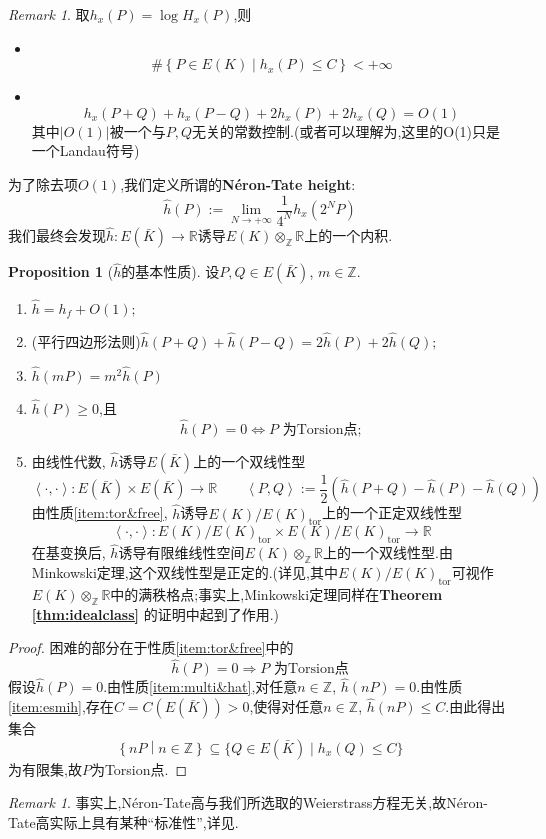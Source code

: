 \documentclass[12pt,A4paper,oneside,reqno]{amsart}
\numberwithin{equation}{section}
\theoremstyle{definition}
\newtheorem{proposition}[theorem]{Proposition}
\theoremstyle{plain}
\theoremstyle{plain}
\numberwithin{equation}{section}
\theoremstyle{remark}
\newtheorem{remark}[theorem]{Remark}
\DeclareMathOperator{\tor}{\operatorname{tor}}
\begin{document}
\begin{remark}
	取$h_x(P)=\log H_x(P)$,则
	\begin{itemize}
		\item\phantom{1}\\[-1.2cm] $$\#\left\{P \in E(K) \middle| h_x(P) \leqslant C\right\}< +\infty$$
		\item\phantom{1}\\[-1.2cm] $$h_x(P+Q)+h_x(P-Q)+2h_x(P)+2h_x(Q)=O(1)$$
		其中$|O(1)|$被一个与$P,Q$无关的常数控制.(或者可以理解为,这里的O(1)只是一个Landau符号)
	\end{itemize}
为了除去项$O(1)$,我们定义所谓的\textbf{Néron-Tate height}:
$$\hat{h}(P):=\lim_{N \rightarrow +\infty}\frac{1}{4^N}h_x(2^NP)$$
我们最终会发现$\hat{h}:E(\bar{K}) \longrightarrow \mathbb{R}$诱导$E(K) \otimes_{\mathbb{Z}}\mathbb{R}$上的一个内积.
\begin{proposition}[$\hat{h}$的基本性质]
	设$P,Q \in E(\bar{K})$, $m \in \mathbb{Z}$.
	\begin{enumerate}[1.]
		\item \label{item:esmih} $\hat{h}=h_f+O(1);$
		\item (平行四边形法则)$\hat{h}(P+Q)+\hat{h}(P-Q)=2\hat{h}(P)+2\hat{h}(Q);$
		\item\label{item:multi&hat} $\hat{h}(mP)=m^2\hat{h}(P)$
		\item\label{item:tor&free}$\hat{h}(P)\geqslant 0$,且
		$$\hat{h}(P)=0 \Longleftrightarrow P \text{ 为Torsion点};$$
		\item 由线性代数, $\hat{h}$诱导$E(\bar{K})$上的一个双线性型
		$$\left<\cdot,\cdot\right>:E(\bar{K}) \times E(\bar{K}) \longrightarrow \mathbb{R} \qquad \left<P,Q\right>:=\frac{1}{2}\left(\hat{h}(P+Q)-\hat{h}(P)-\hat{h}(Q)\right)$$
		由性质\ref{item:tor&free}, $\hat{h}$诱导$E(K)/E(K)_{\tor}$上的一个正定双线性型
		$$\left<\cdot,\cdot\right>:E(K)/E(K)_{\tor} \times E(K)/E(K)_{\tor} \longrightarrow \mathbb{R}$$
		在基变换后, $\hat{h}$诱导有限维线性空间$E(K)\otimes_{\mathbb{Z}}\mathbb{R}$上的一个双线性型.由Minkowski定理,这个双线性型是正定的.(详见\cite[p131,Theorem 6.17]{milne2006elliptic},其中$E(K)/E(K)_{\tor}$可视作$E(K)\otimes_{\mathbb{Z}}\mathbb{R}$中的满秩格点;事实上,Minkowski定理同样在\textbf{Theorem \ref{thm:idealclass}} 的证明中起到了作用.)
	\end{enumerate}
\end{proposition}
	\begin{proof}
	困难的部分在于性质\ref{item:tor&free}中的
	$$\hat{h}(P)=0 \Longrightarrow P \text{ 为Torsion点}$$
	假设$\hat{h}(P)=0$.由性质\ref{item:multi&hat},对任意$n \in \mathbb{Z}$, $\hat{h}(nP)=0$.由性质\ref{item:esmih},存在$C=C(E(\bar{K})) >0$,使得对任意$n \in \mathbb{Z}$, $\hat{h}(nP)\leqslant C$.由此得出集合
	$$\left\{nP \middle| n \in \mathbb{Z} \right\} \subseteq \{Q \in E(\bar{K})\mid h_x(Q)\leqslant C \}$$
	为有限集,故$P$为Torsion点.
\end{proof}
\begin{remark}
	事实上,Néron-Tate高与我们所选取的Weierstrass方程无关,故Néron-Tate高实际上具有某种“标准性”,详见\cite[Theorem 9.3,(e)]{tate1974the}.
\end{remark}
\end{remark}
\end{document}
